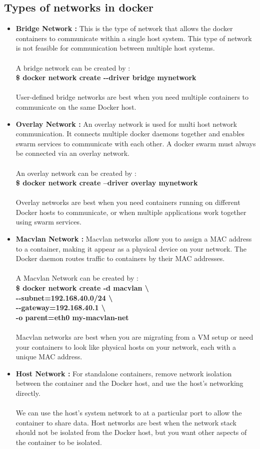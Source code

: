 \documentclass[12pt]{report}
\begin{document}
\subsection{Types of networks in docker}
\begin{itemize}
	\item \textbf{Bridge Network : }This is the type of network that allows the docker containers to communicate within a single host system. This type of network is not feasible for communication between multiple host systems.\\\\
	A bridge network can be created by :\\
	\textbf{\$ docker network create -{}-driver bridge mynetwork}\\\\
	User-defined bridge networks are best when you need multiple containers to communicate on the same Docker host.
	\item \textbf{Overlay Network : }An overlay network is used for multi host network communication. It connects multiple docker daemons together and enables swarm services to communicate with each other. A docker swarm must always be connected via an overlay network.\\\\
	An overlay network can be created by :\\
	\textbf{\$ docker network create --driver overlay mynetwork}\\\\
	Overlay networks are best when you need containers running on different Docker hosts to communicate, or when multiple applications work together using swarm services.
	\item \textbf{Macvlan Network : }Macvlan networks allow you to assign a MAC address to a container, making it appear as a physical device on your network. The Docker daemon routes traffic to containers by their MAC addresses.\\\\
	A Macvlan Network can be created by :\\
	\textbf{\$ docker network create -d macvlan \textbackslash \\
		-{}-subnet=192.168.40.0/24 \textbackslash \\
		-{}-gateway=192.168.40.1 \textbackslash \\
		-o parent=eth0 my-macvlan-net\\\\
	}
	Macvlan networks are best when you are migrating from a VM setup or need your containers to look like physical hosts on your network, each with a unique MAC address.
	\item \textbf{Host Network : }For standalone containers, remove network isolation between the container and the Docker host, and use the host’s networking directly.\\\\
	We can use the host’s system network to at a particular port to allow the container to share data. Host networks are best when the network stack should not be isolated from the Docker host, but you want other aspects of the container to be isolated.
\end{itemize}
\end{document}
